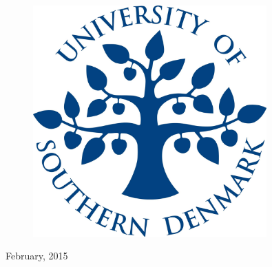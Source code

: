 \begin{center}


\begin{figure}[htbp]
\centering
\includegraphics[height=0.8\measurepage,width=0.8\textwidth,keepaspectratio]{logo.jpg} %
\end{figure} 
\vspace{1cm}
{\Huge February, 2015}\\[1cm]
\end{center}
 \thispagestyle{empty}

\vfill %
